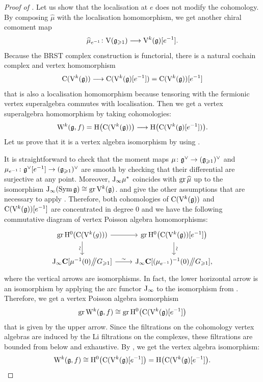 \begin{proof}[Proof of ]
	Let us show that the localisation at $e$ does not modify the cohomology. By composing $\widehat{\mu}$ with the localisation homomorphism, we get another chiral comoment map
	\[ \widehat\mu_{e^{-1}} \colon \mathrm V(\mathfrak g_{\geqslant 1}) \longrightarrow \mathrm V^k(\mathfrak g)[e^{-1}]. \]
	Because the BRST complex construction is functorial, there is a natural cochain complex and vertex homomorphism
	\[ \mathrm{C}(\mathrm V^k(\mathfrak g)) \longrightarrow \mathrm{C}(\mathrm V^k(\mathfrak g)[e^{-1}]) = \mathrm{C}(\mathrm V^k(\mathfrak g))[e^{-1}] \]
	that is also a localisation homomorphism because tensoring with the fermionic vertex superalgebra commutes with localisation. Then we get a vertex superalgebra homomorphism by taking cohomologies:
	\[ \mathrm W^k(\mathfrak g, f) = \mathrm{H}\big(\mathrm{C}(\mathrm V^k(\mathfrak g))\big) \longrightarrow  \mathrm{H}\big(\mathrm{C}(\mathrm V^k(\mathfrak g)[e^{-1}])\big). \]
	Let us prove that it is a vertex algebra isomorphism by using .

	It is straightforward to check that the moment maps $\mu\colon \mathfrak g^\vee \rightarrow (\mathfrak g_{\geqslant 1})^\vee$ and $\mu_{e^{-1}}\colon \mathfrak g^\vee[e^{-1}] \rightarrow (\mathfrak g_{\geqslant 1})^\vee$ are smooth by checking that their differential are surjective at any point. Moreover, $\mathrm{J}_\infty \mu^*$ coincides with $\operatorname{gr} \widehat{\mu}$ up to the isomorphism $\mathrm{J}_\infty(\operatorname{Sym} \mathfrak g) \cong \operatorname{gr} \mathrm V^k(\mathfrak g)$.  and  give the other assumptions that are necessary to apply . Therefore, both cohomologies of $\mathrm{C}(\mathrm V^k(\mathfrak g))$ and $\mathrm{C}(\mathrm V^k(\mathfrak g))[e^{-1}]$ are concentrated in degree $0$ and we have the following commutative diagram of vertex Poisson algebra homomorphisms:
	\[ \begin{tikzcd}
		\gr \Hgy^0(\Cpx(\V^k(g))) \arrow[r] \arrow[d, "\sim"'{sloped}] & \gr \Hgy^0\big(\Cpx(\V^k(\g))[e^{-1}]\big) \arrow[d, "\sim"{sloped}] \\
		\J_\infty \C[\mu^{-1}(0) \git G_{\geqslant 1}] \arrow[r, "\sim"] & \J_\infty \C[(\mu_{e^{-1}})^{-1}(0) \git G_{\geqslant 1}],
	\end{tikzcd} \]
	where the vertical arrows are isomorphisms. In fact, the lower horizontal arrow is an isomorphism by applying the arc functor $\mathrm{J}_\infty$ to the isomorphism from . Therefore, we get a vertex Poisson algebra isomorphism
	\[ \operatorname{gr} \mathrm W^k(\mathfrak g, f) \cong \operatorname{gr} \mathrm{H}^0\big(\mathrm{C}(\mathrm V^k(\mathfrak g)[e^{-1}]\big) \]
	that is given by the upper arrow. Since the filtrations on the cohomology vertex algebras are induced by the Li filtrations on the complexes, these filtrations are bounded from below and exhaustive. By , we get the vertex algebra isomorphism:
	\[ \mathrm W^k(\mathfrak g, f) \cong \mathrm{H}^0\big(\mathrm{C}(\mathrm V^k(\mathfrak g)[e^{-1}]\big) = \mathrm{H}\big(\mathrm{C}(\mathrm V^k(\mathfrak g)[e^{-1}]\big). \]
	

\end{proof}
